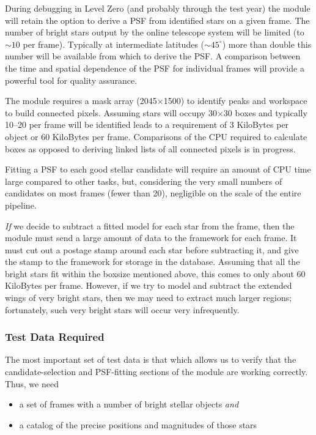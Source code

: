 During debugging in Level Zero (and probably through the test year) 
the \fbs module will retain the option
to derive a PSF from identified stars on a given frame. The number of
bright stars 
output by the online telescope system will be limited (to $\sim 10$
per frame). Typically at intermediate latitudes ($\sim 45^\circ$) more
than double this number will be available from which to derive the
PSF. A comparison between the time and spatial dependence of the PSF
for individual frames will provide a powerful tool for quality assurance. 

The \fbs module requires a mask array (2045$\times$1500) to
identify peaks and workspace to build connected pixels. Assuming stars will
occupy 30$\times$30 boxes and typically 10--20 per frame will be identified
leads to a requirement of 3 KiloBytes 
per object or 60 KiloBytes per frame. Comparisons of the CPU
required to calculate boxes as opposed to deriving linked lists of all
connected pixels is in progress.

Fitting a PSF to each good stellar candidate will require an
amount of CPU time large compared to other tasks, but, considering
the very small numbers of candidates on most frames (fewer than 20),
negligible on the scale of the entire pipeline.  

{\it If} we decide to subtract a fitted model for each star
from the frame, then the \fbs module must send a large amount of
data to the framework for each frame.  It must cut out a postage
stamp around each star before subtracting it, and give the stamp
to the framework for storage in the database.  Assuming that
all the bright stars fit within the boxsize mentioned above,
this comes to only about 60 KiloBytes per frame.  However,
if we try to model and subtract the extended wings of very
bright stars, then we may need to extract much larger
regions;  fortunately, such very bright stars will occur
very infrequently.

\subsubsection {Test Data Required}

The most important set of test data is that which allows us to
verify that the candidate-selection and PSF-fitting sections of
the module are working correctly.  Thus, we need

\begin{itemize}
  \item a set of frames with a number of bright stellar objects {\it and}
  \item a catalog of the precise positions and magnitudes of those stars
\end{itemize}

